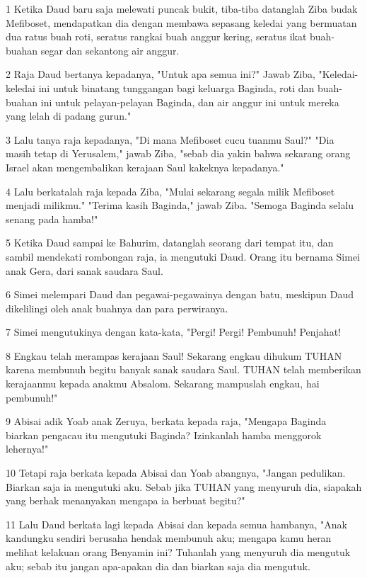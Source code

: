 \par 1 Ketika Daud baru saja melewati puncak bukit, tiba-tiba datanglah Ziba budak Mefiboset, mendapatkan dia dengan membawa sepasang keledai yang bermuatan dua ratus buah roti, seratus rangkai buah anggur kering, seratus ikat buah-buahan segar dan sekantong air anggur.
\par 2 Raja Daud bertanya kepadanya, "Untuk apa semua ini?" Jawab Ziba, "Keledai-keledai ini untuk binatang tunggangan bagi keluarga Baginda, roti dan buah-buahan ini untuk pelayan-pelayan Baginda, dan air anggur ini untuk mereka yang lelah di padang gurun."
\par 3 Lalu tanya raja kepadanya, "Di mana Mefiboset cucu tuanmu Saul?" "Dia masih tetap di Yerusalem," jawab Ziba, "sebab dia yakin bahwa sekarang orang Israel akan mengembalikan kerajaan Saul kakeknya kepadanya."
\par 4 Lalu berkatalah raja kepada Ziba, "Mulai sekarang segala milik Mefiboset menjadi milikmu." "Terima kasih Baginda," jawab Ziba. "Semoga Baginda selalu senang pada hamba!"
\par 5 Ketika Daud sampai ke Bahurim, datanglah seorang dari tempat itu, dan sambil mendekati rombongan raja, ia mengutuki Daud. Orang itu bernama Simei anak Gera, dari sanak saudara Saul.
\par 6 Simei melempari Daud dan pegawai-pegawainya dengan batu, meskipun Daud dikelilingi oleh anak buahnya dan para perwiranya.
\par 7 Simei mengutukinya dengan kata-kata, "Pergi! Pergi! Pembunuh! Penjahat!
\par 8 Engkau telah merampas kerajaan Saul! Sekarang engkau dihukum TUHAN karena membunuh begitu banyak sanak saudara Saul. TUHAN telah memberikan kerajaanmu kepada anakmu Absalom. Sekarang mampuslah engkau, hai pembunuh!"
\par 9 Abisai adik Yoab anak Zeruya, berkata kepada raja, "Mengapa Baginda biarkan pengacau itu mengutuki Baginda? Izinkanlah hamba menggorok lehernya!"
\par 10 Tetapi raja berkata kepada Abisai dan Yoab abangnya, "Jangan pedulikan. Biarkan saja ia mengutuki aku. Sebab jika TUHAN yang menyuruh dia, siapakah yang berhak menanyakan mengapa ia berbuat begitu?"
\par 11 Lalu Daud berkata lagi kepada Abisai dan kepada semua hambanya, "Anak kandungku sendiri berusaha hendak membunuh aku; mengapa kamu heran melihat kelakuan orang Benyamin ini? Tuhanlah yang menyuruh dia mengutuk aku; sebab itu jangan apa-apakan dia dan biarkan saja dia mengutuk.
